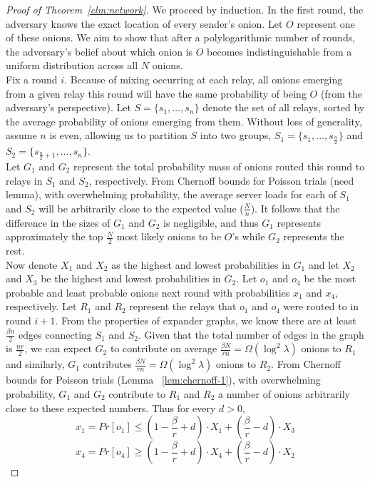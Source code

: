 \begin{proof} [Proof of Theorem~\ref{clm:network}]

    We proceed by induction. In the first round, the adversary knows the exact location of every sender's onion. Let $O$ represent one of these onions. We aim to show that after a polylogarithmic number of rounds, the adversary's belief about which onion is $O$ becomes indistinguishable from a uniform distribution across all $N$ onions.\\
    
    Fix a round $i$. Because of mixing occurring at each relay, all onions emerging from a given relay this round will have the same probability of being $O$ (from the adversary’s perspective). Let $S = \{ s_1, \dots, s_n \}$ denote the set of all relays, sorted by the average probability of onions emerging from them. Without loss of generality, assume $n$ is even, allowing us to partition $S$ into two groups, $S_1 = \{ s_1,..., s_{\frac{n}{2}} \}$ and $S_2 = \{ s_{\frac{n}{2} + 1},..., s_n \}$.\\

    Let $G_1$ and $G_2$ represent the total probability mass of onions routed this round to relays in $S_1$ and $S_2$, respectively. From Chernoff bounds for Poisson trials (need lemma), with overwhelming probability, the average server loads for each of $S_1$ and $S_2$ will be arbitrarily close to the expected value ($\frac{N}{n}$). It follows that the difference in the sizes of $G_1$ and $G_2$ is negligible, and thus $G_1$ represents approximately the top $\frac{N}{2}$ most likely onions to be $O$'s while $G_2$ represents the rest. \\
    
    Now denote $X_1$ and $X_2$ as the highest and lowest probabilities in $G_1$ and let $X_2$ and $X_3$ be the highest and lowest probabilities in $G_2$. Let $o_1$ and $o_4$ be the most probable and least probable onions next round with probabilities $x_1$ and $x_4$, respectively. Let $R_1$ and $R_2$ represent the relays that $o_1$ and $o_4$ were routed to in round $i + 1$. From the properties of expander graphs, we know there are at least $\frac{\beta n}{2}$ edges connecting $S_1$ and $S_2$. Given that the total number of edges in the graph is $\frac{nr}{2}$, we can expect $G_2$ to contribute on average $\frac{\beta N}{r n} = \Omega(\log^2 \lambda)$ onions to $R_1$ and similarly, $G_1$ contributes $\frac{\beta N}{r n} = \Omega(\log^2 \lambda)$ onions to $R_2$. From Chernoff bounds for Poisson trials (Lemma ~\ref{lem:chernoff-1}), with overwhelming probability, $G_1$ and $G_2$ contribute to $R_1$ and $R_2$ a number of onions arbitrarily close to these expected numbers. Thus for every $d > 0$,
    $$
    x_1 = Pr[o_1] \leq \left( 1 - \frac{\beta}{r} + d \right) \cdot X_1 + \left(\frac{\beta}{r} - d \right) \cdot X_3
    $$
    $$
    x_4 = Pr[o_4] \geq \left( 1 - \frac{\beta}{r} + d \right) \cdot X_4 + \left(\frac{\beta}{r} - d \right) \cdot X_2
    $$


\end{proof}
